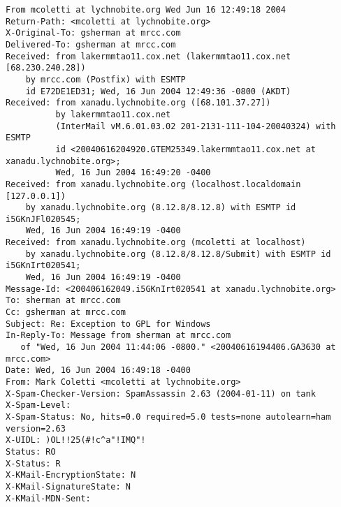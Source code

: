 \begin{small}
\begin{verbatim}
From mcoletti at lychnobite.org Wed Jun 16 12:49:18 2004
Return-Path: <mcoletti at lychnobite.org>
X-Original-To: gsherman at mrcc.com
Delivered-To: gsherman at mrcc.com
Received: from lakermmtao11.cox.net (lakermmtao11.cox.net [68.230.240.28])
	by mrcc.com (Postfix) with ESMTP
	id E72DE1ED31; Wed, 16 Jun 2004 12:49:36 -0800 (AKDT)
Received: from xanadu.lychnobite.org ([68.101.37.27])
          by lakermmtao11.cox.net
          (InterMail vM.6.01.03.02 201-2131-111-104-20040324) with ESMTP
          id <20040616204920.GTEM25349.lakermmtao11.cox.net at xanadu.lychnobite.org>;
          Wed, 16 Jun 2004 16:49:20 -0400
Received: from xanadu.lychnobite.org (localhost.localdomain [127.0.0.1])
	by xanadu.lychnobite.org (8.12.8/8.12.8) with ESMTP id i5GKnJFl020545;
	Wed, 16 Jun 2004 16:49:19 -0400
Received: from xanadu.lychnobite.org (mcoletti at localhost)
	by xanadu.lychnobite.org (8.12.8/8.12.8/Submit) with ESMTP id i5GKnIrt020541;
	Wed, 16 Jun 2004 16:49:19 -0400
Message-Id: <200406162049.i5GKnIrt020541 at xanadu.lychnobite.org>
To: sherman at mrcc.com
Cc: gsherman at mrcc.com
Subject: Re: Exception to GPL for Windows 
In-Reply-To: Message from sherman at mrcc.com 
   of "Wed, 16 Jun 2004 11:44:06 -0800." <20040616194406.GA3630 at mrcc.com> 
Date: Wed, 16 Jun 2004 16:49:18 -0400
From: Mark Coletti <mcoletti at lychnobite.org>
X-Spam-Checker-Version: SpamAssassin 2.63 (2004-01-11) on tank
X-Spam-Level: 
X-Spam-Status: No, hits=0.0 required=5.0 tests=none autolearn=ham version=2.63
X-UIDL: )OL!!25(#!c^a"!IMQ"!
Status: RO
X-Status: R
X-KMail-EncryptionState: N
X-KMail-SignatureState: N
X-KMail-MDN-Sent:  



\end{verbatim}
\end{small}

